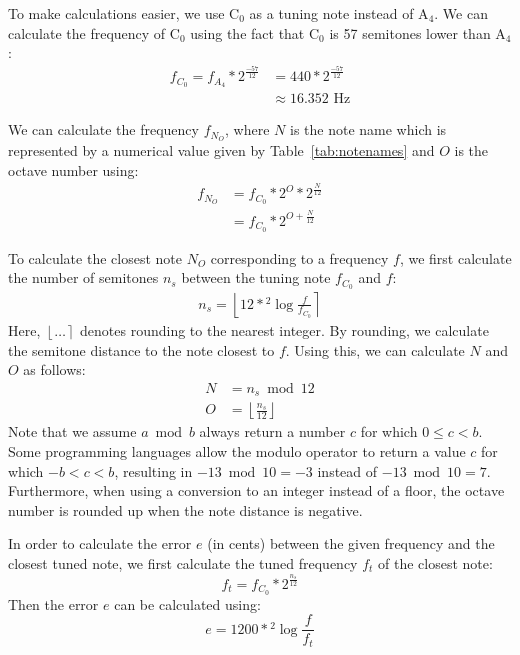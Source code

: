 \documentclass[a4paper,10pt,twocolumn]{article}
\newcommand{\note}[2]{#1${}_{#2}$}
\newcommand{\floor}[1]{\left \lfloor #1 \right \rfloor}
\newcommand{\round}[1]{\left \lfloor #1 \right \rceil}
\begin{document}
To make calculations easier, we use \note{C}{0} as a tuning note instead of \note{A}{4}. We can calculate the frequency of \note{C}{0} using the fact that \note{C}{0} is 57 semitones lower than \note{A}{4}:
\begin{align*}
    f_{C_0} = f_{A_4} * 2^{\frac{-57}{12}} &= 440 * 2^{\frac{-57}{12}} \\
                                           &\approx 16.352 \text{ Hz}
\end{align*}

We can calculate the frequency $f_{N_O}$, where $N$ is the note name which is represented by a numerical value given by Table~\ref{tab:notenames} and $O$ is the octave number using:
\begin{align*}
    f_{N_O} &= f_{C_0} * 2^O * 2^{\frac{N}{12}} \\
            &= f_{C_0} * 2^{O + \frac{N}{12}}
\end{align*}

To calculate the closest note $N_O$ corresponding to a frequency $f$, we first calculate the number of semitones $n_s$ between the tuning note $f_{C_0}$ and $f$:
\begin{align*}
    n_s = \round{12 * {}^{2}\!\log{\frac{f}{f_{C_0}}}}
\end{align*}
Here, $\round{\ldots}$ denotes rounding to the nearest integer. By rounding, we calculate the semitone distance to the note closest to $f$. Using this, we can calculate $N$ and $O$ as follows:
\begin{align*}
    N &= n_s \bmod 12 \\
    O &= \floor{\frac{n_s}{12}}
\end{align*}
Note that we assume $a \bmod b$ always return a number $c$ for which $0 \leq c < b$. Some programming languages allow the modulo operator to return a value $c$ for which $-b < c < b$, resulting in $-13 \bmod 10 = -3$ instead of $-13 \bmod 10 = 7$. Furthermore, when using a conversion to an integer instead of a floor, the octave number is rounded up when the note distance is negative.

In order to calculate the error $e$ (in cents) between the given frequency and the closest tuned note, we first calculate the tuned frequency $f_t$ of the closest note:
\[ f_t = f_{C_0} * 2^{\frac{n_s}{12}} \]
Then the error $e$ can be calculated using:
\[ e = 1200 * {}^{2}\!\log{\frac{f}{f_t}} \]
\end{document}
